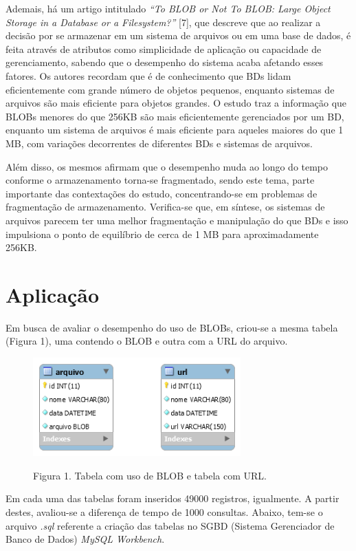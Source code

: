 \documentclass[12pt,a4paper]{article}
\begin{document}
Ademais, há um artigo intitulado \textit{``To BLOB or Not To BLOB: Large Object Storage in a Database or a Filesystem?''} [7], que descreve que ao realizar a decisão por se armazenar em um sistema de arquivos ou em uma base de dados, é feita através de atributos como simplicidade de aplicação ou capacidade de gerenciamento, sabendo que o desempenho do sistema acaba afetando esses fatores. Os autores recordam que é de conhecimento que BDs lidam eficientemente com
grande número de objetos pequenos, enquanto sistemas de arquivos são mais eficiente para objetos grandes. O estudo traz a informação que BLOBs menores do que 256KB são mais eficientemente gerenciados por um BD, enquanto um sistema de arquivos é mais eficiente para aqueles maiores do que 1 MB, com variações decorrentes de diferentes BDs e sistemas de arquivos.

Além disso, os mesmos afirmam que o desempenho muda ao longo do tempo conforme o armazenamento torna-se fragmentado, sendo este tema, parte importante das contextações do estudo, concentrando-se em problemas de fragmentação de armazenamento. Verifica-se que, em síntese, os sistemas de arquivos parecem ter uma melhor fragmentação e manipulação do que BDs e isso impulsiona o ponto de equilíbrio de cerca de 1 MB para aproximadamente 256KB.

 


\section{Aplicação}
Em busca de avaliar o desempenho do uso de BLOBs, criou-se a mesma tabela (Figura 1), uma contendo o BLOB e outra com a URL do arquivo.

\begin{figure}[htb]
	\label{figura:tabelas}
	\centering
	\includegraphics[width=8cm]{recursos/imagens/tabelas.png} 
	
	Figura 1. Tabela com uso de BLOB e tabela com URL.
\end{figure}

Em cada uma das tabelas foram inseridos 49000 registros, igualmente. A partir destes, avaliou-se a diferença de tempo de 1000 consultas. Abaixo, tem-se o arquivo \textit{.sql} referente a criação das tabelas no SGBD (Sistema Gerenciador de Banco de Dados) \textit{MySQL Workbench}. \\\vspace{0.1cm}
\end{document}
